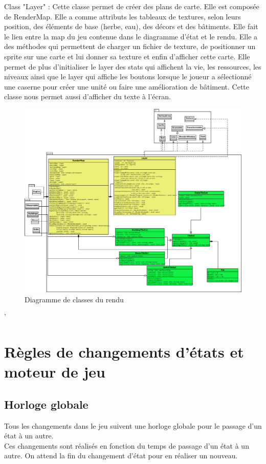 \documentclass[12pt,a4paper]{article}
\begin{document}
Class "Layer" : Cette classe permet de créer des plans de carte. Elle est composée de RenderMap. Elle a comme attributs les tableaux de textures, selon leurs position, des éléments de base (herbe, eau), des décors et des bâtiments. Elle fait le lien entre la map du jeu contenue dans le diagramme d'état et le rendu. Elle a des méthodes qui permettent de charger un fichier de texture, de positionner un sprite sur une carte et lui donner sa texture et enfin d'afficher cette carte. Elle permet de plus d'initialiser le layer des stats qui affichent la vie, les ressources, les niveaux ainsi que le layer qui affiche les boutons lorsque le joueur a sélectionné une caserne pour créer une unité ou faire une amélioration de bâtiment. Cette classe nous permet aussi d'afficher du texte à l'écran.


\begin{figure}[!ht]
\centering
    \includegraphics[width=1\textwidth]{ressources/render.png}
     \caption{Diagramme de classes du rendu}
\end{figure}

\newpage
'
\newpage

\section{Règles de changements d'états et moteur de jeu}

\subsection{Horloge globale}
Tous les changements dans le jeu suivent une horloge globale pour le passage d'un état à un autre. \\
Ces changements sont réalisés en fonction du temps de passage d'un état à un autre. On attend la fin du changement d'état pour en réaliser un nouveau.
\end{document}
